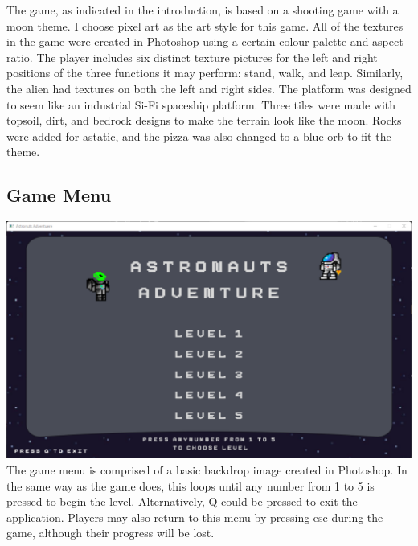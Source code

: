 The game, as indicated in the introduction, is based on a shooting game with a moon theme. I choose pixel art as the art style for this game. All of the textures in the game were created in Photoshop using a certain colour palette and aspect ratio. The player includes six distinct texture pictures for the left and right positions of the three functions it may perform: stand, walk, and leap. Similarly, the alien had textures on both the left and right sides. The platform was designed to seem like an industrial Si-Fi spaceship platform. Three tiles were made with topsoil, dirt, and bedrock designs to make the terrain look like the moon. Rocks were added for astatic, and the pizza was also changed to a blue orb to fit the theme.

\subsection{Game Menu}
\includegraphics[width=1\linewidth]{images/ss5.png}
The game menu is comprised of a basic backdrop image created in Photoshop. In the same way as the game does, this loops until any number from 1 to 5 is pressed to begin the level. Alternatively, Q could be pressed to exit the application. Players may also return to this menu by pressing esc during the game, although their progress will be lost. 



 \newpage

